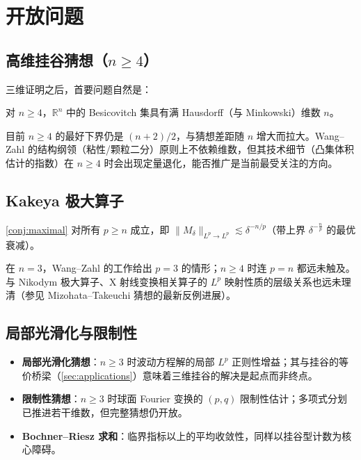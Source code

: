 \section{开放问题}\label{sec:open_problems}

\subsection{高维挂谷猜想（$n \ge 4$）}

三维证明之后，首要问题自然是：

\begin{conjecture}
    对 $n \ge 4$，$\mathbb{R}^n$ 中的 Besicovitch 集具有满 Hausdorff（与 Minkowski）维数 $n$。
\end{conjecture}

目前 $n \ge 4$ 的最好下界仍是 $(n+2)/2$\cite{wolff1995}，与猜想差距随 $n$ 增大而拉大。Wang--Zahl 的结构纲领（粘性/颗粒二分）原则上不依赖维数，但其技术细节（凸集体积估计的指数）在 $n \ge 4$ 时会出现定量退化，能否推广是当前最受关注的方向。

\subsection{Kakeya 极大算子}

\begin{conjecture}
    \cref{conj:maximal} 对所有 $p \ge n$ 成立，即 $\|M_\delta\|_{L^p \to L^p} \lesssim \delta^{-n/p}$（带上界 $\delta^{-\frac{n}{p}}$ 的最优衰减）。
\end{conjecture}

在 $n = 3$，Wang--Zahl 的工作给出 $p = 3$ 的情形；$n \ge 4$ 时连 $p = n$ 都远未触及。与 Nikodym 极大算子、X 射线变换相关算子的 $L^p$ 映射性质的层级关系也远未理清（参见 Mizohata--Takeuchi 猜想的最新反例进展）。

\subsection{局部光滑化与限制性}

\begin{itemize}
    \item \textbf{局部光滑化猜想}：$n \ge 3$ 时波动方程解的局部 $L^p$ 正则性增益；其与挂谷的等价桥梁（\cref{sec:applications}）意味着三维挂谷的解决是起点而非终点。
    \item \textbf{限制性猜想}：$n \ge 3$ 时球面 Fourier 变换的 $(p, q)$ 限制性估计；多项式分划已推进若干维数，但完整猜想仍开放。
    \item \textbf{Bochner--Riesz 求和}：临界指标以上的平均收敛性，同样以挂谷型计数为核心障碍。
\end{itemize}

